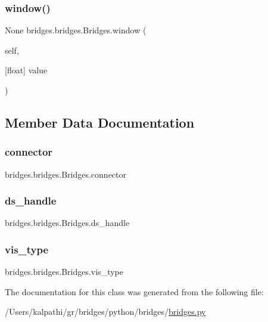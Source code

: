 \subsubsection{\texorpdfstring{window()}{window()}\hspace{0.1cm}{\footnotesize\ttfamily [2/2]}}
{\footnotesize\ttfamily  None bridges.\+bridges.\+Bridges.\+window (\begin{DoxyParamCaption}\item[{}]{self,  }\item[{\mbox{[}float\mbox{]}}]{value }\end{DoxyParamCaption})}



\subsection{Member Data Documentation}
\mbox{\label{classbridges_1_1bridges_1_1_bridges_a1c02ee44e7a4a3ee2f7d9c7d7da7d09f}} 
\subsubsection{\texorpdfstring{connector}{connector}}
{\footnotesize\ttfamily bridges.\+bridges.\+Bridges.\+connector}

\mbox{\label{classbridges_1_1bridges_1_1_bridges_a7a6f25612be64d4f3e203d7d37cb4da4}} 
\subsubsection{\texorpdfstring{ds\_handle}{ds\_handle}}
{\footnotesize\ttfamily bridges.\+bridges.\+Bridges.\+ds\+\_\+handle}

\mbox{\label{classbridges_1_1bridges_1_1_bridges_a5ca152bf3830e2be1f72247463916f82}} 
\subsubsection{\texorpdfstring{vis\_type}{vis\_type}}
{\footnotesize\ttfamily bridges.\+bridges.\+Bridges.\+vis\+\_\+type}



The documentation for this class was generated from the following file\+:\begin{DoxyCompactItemize}
\item 
/\+Users/kalpathi/gr/bridges/python/bridges/\mbox{\hyperlink{bridges_8py}{bridges.\+py}}\end{DoxyCompactItemize}

